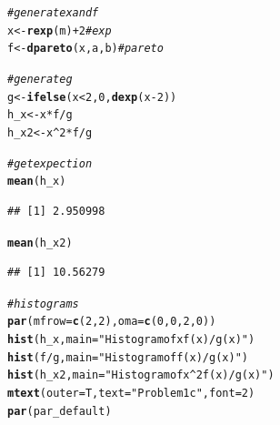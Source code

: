 \documentclass{article}\usepackage[]{graphicx}\usepackage[]{color}
\makeatletter
\newcommand{\hlnum}[1]{\textcolor[rgb]{0.686,0.059,0.569}{#1}}%
\newcommand{\hlstr}[1]{\textcolor[rgb]{0.192,0.494,0.8}{#1}}%
\newcommand{\hlcom}[1]{\textcolor[rgb]{0.678,0.584,0.686}{\textit{#1}}}%
\newcommand{\hlopt}[1]{\textcolor[rgb]{0,0,0}{#1}}%
\newcommand{\hlstd}[1]{\textcolor[rgb]{0.345,0.345,0.345}{#1}}%
\newcommand{\hlkwb}[1]{\textcolor[rgb]{0.69,0.353,0.396}{#1}}%
\newcommand{\hlkwc}[1]{\textcolor[rgb]{0.333,0.667,0.333}{#1}}%
\newcommand{\hlkwd}[1]{\textcolor[rgb]{0.737,0.353,0.396}{\textbf{#1}}}%
\newenvironment{kframe}{%
 \def\at@end@of@kframe{}%
 \ifinner\ifhmode%
  \def\at@end@of@kframe{\end{minipage}}%
  \begin{minipage}{\columnwidth}%
 \fi\fi%
 \def\FrameCommand##1{\hskip\@totalleftmargin \hskip-\fboxsep
 \colorbox{shadecolor}{##1}\hskip-\fboxsep
     \hskip-\linewidth \hskip-\@totalleftmargin \hskip\columnwidth}%
 \MakeFramed {\advance\hsize-\width
   \@totalleftmargin\z@ \linewidth\hsize
   \@setminipage}}%
 {\par\unskip\endMakeFramed%
 \at@end@of@kframe}
\newenvironment{knitrout}{}{} %
\makeatother
\begin{document}
\begin{knitrout}
\color{fgcolor}\begin{kframe}
\begin{alltt}
\hlcom{#generate x and f}
\hlstd{x} \hlkwb{<-} \hlkwd{rexp}\hlstd{(m)}\hlopt{+}\hlnum{2} \hlcom{#exp}
\hlstd{f} \hlkwb{<-} \hlkwd{dpareto}\hlstd{(x, a, b)} \hlcom{#pareto}

\hlcom{#generate g}
\hlstd{g} \hlkwb{<-} \hlkwd{ifelse}\hlstd{(x}\hlopt{<}\hlnum{2}\hlstd{,} \hlnum{0}\hlstd{,} \hlkwd{dexp}\hlstd{(x}\hlopt{-}\hlnum{2}\hlstd{))}
\hlstd{h_x} \hlkwb{<-} \hlstd{x}\hlopt{*}\hlstd{f}\hlopt{/}\hlstd{g}
\hlstd{h_x2} \hlkwb{<-} \hlstd{x}\hlopt{^}\hlnum{2}\hlopt{*}\hlstd{f}\hlopt{/}\hlstd{g}

\hlcom{#get expection}
\hlkwd{mean}\hlstd{(h_x)}
\end{alltt}
\begin{verbatim}
## [1] 2.950998
\end{verbatim}
\begin{alltt}
\hlkwd{mean}\hlstd{(h_x2)}
\end{alltt}
\begin{verbatim}
## [1] 10.56279
\end{verbatim}
\begin{alltt}
\hlcom{#histograms}
\hlkwd{par}\hlstd{(}\hlkwc{mfrow} \hlstd{=} \hlkwd{c}\hlstd{(}\hlnum{2}\hlstd{,} \hlnum{2}\hlstd{),} \hlkwc{oma} \hlstd{=} \hlkwd{c}\hlstd{(}\hlnum{0}\hlstd{,} \hlnum{0}\hlstd{,} \hlnum{2}\hlstd{,} \hlnum{0}\hlstd{))}
\hlkwd{hist}\hlstd{(h_x,} \hlkwc{main} \hlstd{=} \hlstr{"Histogram of x f(x) / g(x)"}\hlstd{)}
\hlkwd{hist}\hlstd{(f} \hlopt{/} \hlstd{g,} \hlkwc{main} \hlstd{=} \hlstr{"Histogram of f(x)/g(x)"}\hlstd{)}
\hlkwd{hist}\hlstd{(h_x2,} \hlkwc{main} \hlstd{=} \hlstr{"Histogram of x^2 f(x) / g(x)"}\hlstd{)}
\hlkwd{mtext}\hlstd{(}\hlkwc{outer} \hlstd{= T,} \hlkwc{text} \hlstd{=} \hlstr{"Problem 1c"}\hlstd{,} \hlkwc{font} \hlstd{=} \hlnum{2}\hlstd{)}
\hlkwd{par}\hlstd{(par_default)}
\end{alltt}
\end{kframe}

\end{knitrout}
\end{document}
